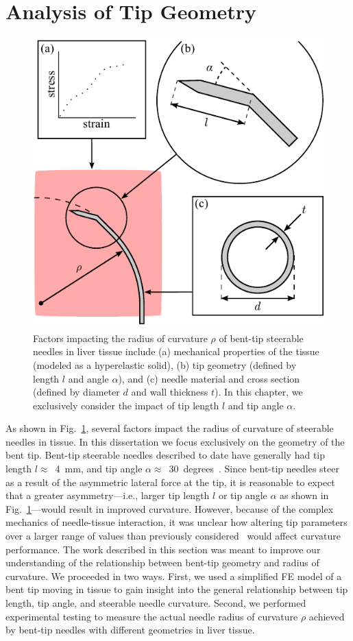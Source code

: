\section{Analysis of Tip Geometry }
\label{sec:TipGeometryAnalysis}
\begin{figure}[!t]
\centering
\includegraphics[width = 0.6\columnwidth]{Images/Chapter3/CurvatureFactors/CurvatureFactors}%
\caption[Factors impacting steerable needle curvature]{Factors impacting the radius of curvature $\rho$ of bent-tip steerable needles in liver tissue include (a) mechanical properties of the tissue (modeled as a hyperelastic solid), (b) tip geometry (defined by length $l$ and angle $\alpha$), and (c) needle material and cross section (defined by diameter $d$ and wall thickness $t$). In this chapter, we exclusively consider the impact of tip length $l$ and tip angle $\alpha$.}
\label{fig:NSFactors}
\end{figure}
As shown in Fig.~\ref{fig:NSFactors}, several factors impact the radius of curvature of steerable needles in tissue. In this dissertation we focus exclusively on the geometry of the bent tip. Bent-tip steerable needles described to date have generally had tip length $l \approx$~4~mm, and tip angle $\alpha \approx$~30~degrees~\cite{Patil2014,Swaney2013,Rucker2013,Majewicz2012}. Since bent-tip needles steer as a result of the asymmetric lateral force at the tip, it is reasonable to expect that a greater asymmetry---i.e., larger tip length $l$ or tip angle $\alpha$ as shown in Fig.~\ref{fig:NSFactors}---would result in improved curvature. However, because of the complex mechanics of needle-tissue interaction, it was unclear how altering tip parameters over a larger range of values than previously considered~\cite{Majewicz2010} would affect curvature performance. The work described in this section was meant to improve our understanding of the relationship between bent-tip geometry and radius of curvature. We proceeded in two ways. First, we used a simplified FE model of a bent tip moving in tissue to gain insight into the general relationship between tip length, tip angle, and steerable needle curvature. Second, we performed experimental testing to measure the actual needle radius of curvature $\rho$ achieved by bent-tip needles with different geometries in liver tissue.

